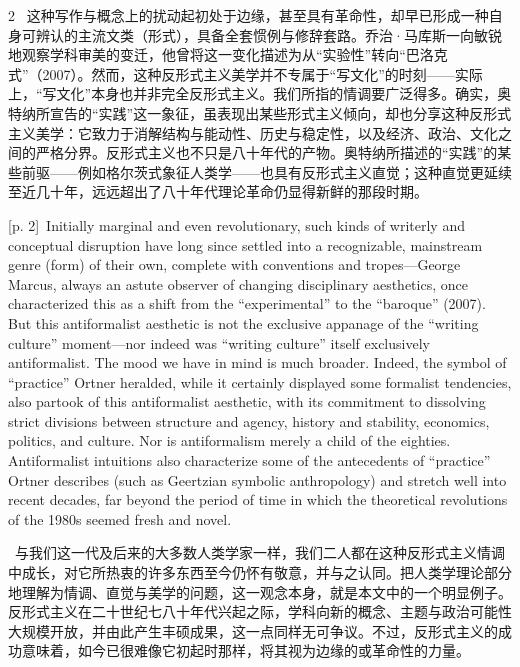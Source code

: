 \documentclass[10pt,a4paper]{article}
\begin{document}
\begin{paracol}{2}
\switchcolumn*
{\scriptsize\color{gray} [p. 2]}\ 这种写作与概念上的扰动起初处于边缘，甚至具有革命性，却早已形成一种自身可辨认的主流文类（形式），具备全套惯例与修辞套路。乔治·马库斯一向敏锐地观察学科审美的变迁，他曾将这一变化描述为从“实验性”转向“巴洛克式”（2007）。然而，这种反形式主义美学并不专属于“写文化”的时刻——实际上，“写文化”本身也并非完全反形式主义。我们所指的情调要广泛得多。确实，奥特纳所宣告的“实践”这一象征，虽表现出某些形式主义倾向，却也分享这种反形式主义美学：它致力于消解结构与能动性、历史与稳定性，以及经济、政治、文化之间的严格分界。反形式主义也不只是八十年代的产物。奥特纳所描述的“实践”的某些前驱——例如格尔茨式象征人类学——也具有反形式主义直觉；这种直觉更延续至近几十年，远远超出了八十年代理论革命仍显得新鲜的那段时期。\par
\switchcolumn
{\scriptsize\color{gray} [p. 2]}\ Initially marginal and even revolutionary, such kinds of writerly and conceptual disruption have long since settled into a recognizable, mainstream genre (form) of their own, complete with conventions and tropes—George Marcus, always an astute observer of changing disciplinary aesthetics, once characterized this as a shift from the “experimental” to the “baroque” (2007). But this antiformalist aesthetic is not the exclusive appanage of the “writing culture” moment—nor indeed was “writing culture” itself exclusively antiformalist. The mood we have in mind is much broader. Indeed, the symbol of “practice” Ortner heralded, while it certainly displayed some formalist tendencies, also partook of this antiformalist aesthetic, with its commitment to dissolving strict divisions between structure and agency, history and stability, economics, politics, and culture. Nor is antiformalism merely a child of the eighties. Antiformalist intuitions also characterize some of the antecedents of “practice” Ortner describes (such as Geertzian symbolic anthropology) and stretch well into recent decades, far beyond the period of time in which the theoretical revolutions of the 1980s seemed fresh and novel.\par
\switchcolumn*
{\scriptsize\color{gray} [p. 3]}\ 与我们这一代及后来的大多数人类学家一样，我们二人都在这种反形式主义情调中成长，对它所热衷的许多东西至今仍怀有敬意，并与之认同。把人类学理论部分地理解为情调、直觉与美学的问题，这一观念本身，就是本文中的一个明显例子。反形式主义在二十世纪七八十年代兴起之际，学科向新的概念、主题与政治可能性大规模开放，并由此产生丰硕成果，这一点同样无可争议。不过，反形式主义的成功意味着，如今已很难像它初起时那样，将其视为边缘的或革命性的力量。\par
\switchcolumn

\end{paracol}
\end{document}
